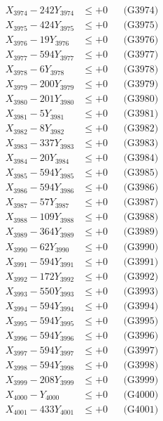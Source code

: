 \documentclass[a4paper,10pt]{article}
\begin{document}
{\begin{align}
X_{3974} - 242Y_{3974} &\leq +0 && \text{(G3974)} \\
X_{3975} - 424Y_{3975} &\leq +0 && \text{(G3975)} \\
X_{3976} - 19Y_{3976} &\leq +0 && \text{(G3976)} \\
X_{3977} - 594Y_{3977} &\leq +0 && \text{(G3977)} \\
X_{3978} - 6Y_{3978} &\leq +0 && \text{(G3978)} \\
X_{3979} - 200Y_{3979} &\leq +0 && \text{(G3979)} \\
X_{3980} - 201Y_{3980} &\leq +0 && \text{(G3980)} \\
\allowbreak
X_{3981} - 5Y_{3981} &\leq +0 && \text{(G3981)} \\
X_{3982} - 8Y_{3982} &\leq +0 && \text{(G3982)} \\
X_{3983} - 337Y_{3983} &\leq +0 && \text{(G3983)} \\
X_{3984} - 20Y_{3984} &\leq +0 && \text{(G3984)} \\
X_{3985} - 594Y_{3985} &\leq +0 && \text{(G3985)} \\
X_{3986} - 594Y_{3986} &\leq +0 && \text{(G3986)} \\
X_{3987} - 57Y_{3987} &\leq +0 && \text{(G3987)} \\
X_{3988} - 109Y_{3988} &\leq +0 && \text{(G3988)} \\
X_{3989} - 364Y_{3989} &\leq +0 && \text{(G3989)} \\
X_{3990} - 62Y_{3990} &\leq +0 && \text{(G3990)} \\
\allowbreak
X_{3991} - 594Y_{3991} &\leq +0 && \text{(G3991)} \\
X_{3992} - 172Y_{3992} &\leq +0 && \text{(G3992)} \\
X_{3993} - 550Y_{3993} &\leq +0 && \text{(G3993)} \\
X_{3994} - 594Y_{3994} &\leq +0 && \text{(G3994)} \\
X_{3995} - 594Y_{3995} &\leq +0 && \text{(G3995)} \\
X_{3996} - 594Y_{3996} &\leq +0 && \text{(G3996)} \\
X_{3997} - 594Y_{3997} &\leq +0 && \text{(G3997)} \\
X_{3998} - 594Y_{3998} &\leq +0 && \text{(G3998)} \\
X_{3999} - 208Y_{3999} &\leq +0 && \text{(G3999)} \\
X_{4000} - Y_{4000} &\leq +0 && \text{(G4000)} \\
\allowbreak
X_{4001} - 433Y_{4001} &\leq +0 && \text{(G4001)} \\

\end{align}}
\end{document}
